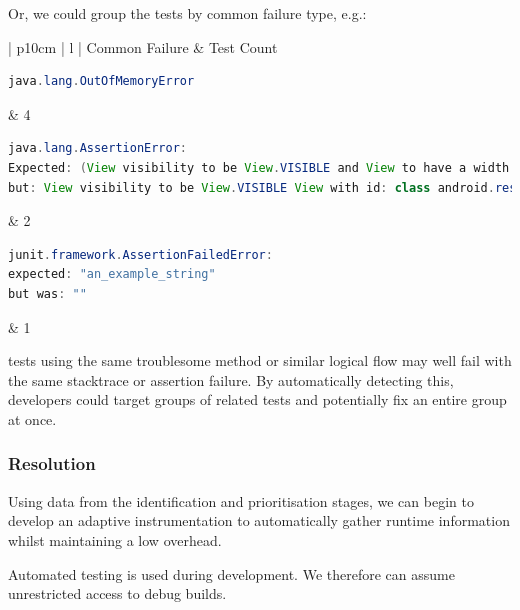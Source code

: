 Or, we could group the tests by common failure type, e.g.:


\begin{center}
    \begin{tabular}{| p{10cm} | l |}
    \hline
    Common Failure & \flaky{} Test Count \\ \hline
    {\begin{lstlisting}[language=Java, numbers=none]
java.lang.OutOfMemoryError
	\end{lstlisting}}
    & 4 \\ \hline
    {\begin{lstlisting}[language=Java, numbers=none]
java.lang.AssertionError:
Expected: (View visibility to be View.VISIBLE and View to have a width and a height)
but: View visibility to be View.VISIBLE View with id: class android.resources.R$id.anExampleView(1) had a visibility of View.GONE
	\end{lstlisting}}
	& 2 \\ \hline
    {\begin{lstlisting}[language=Java, numbers=none]
junit.framework.AssertionFailedError:
expected: "an_example_string"
but was: ""
	\end{lstlisting}}
	& 1 \\ \hline

    \end{tabular}
\end{center}

\flaky{} tests using the same troublesome method or similar logical flow may well fail with the same stacktrace or assertion failure. By automatically detecting this, developers could target groups of related tests and potentially fix an entire group at once.


\subsubsection{Resolution}

Using data from the identification and prioritisation stages, we can begin to develop an adaptive instrumentation to automatically gather runtime information whilst maintaining a low overhead.


Automated testing is used during development. We therefore can assume unrestricted access to debug builds.

